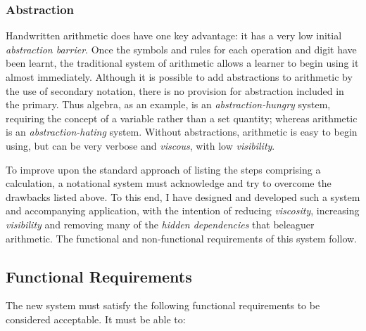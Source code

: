 \documentclass[12pt,twoside,notitlepage,xetex]{report}
\begin{document}
\subsubsection{Abstraction}
Handwritten arithmetic does have one key advantage: it has a very low initial \emph{abstraction barrier}.  Once the symbols and rules for each operation and digit have been learnt, the traditional system of arithmetic allows a learner to begin using it almost immediately.  Although it is possible to add abstractions to arithmetic by the use of secondary notation, there is no provision for abstraction included in the primary.  Thus algebra, as an example, is an \emph{abstraction-hungry} system, requiring the concept of a variable rather than a set quantity; whereas arithmetic is an \emph{abstraction-hating} system.  Without abstractions, arithmetic is easy to begin using, but can be very verbose and \emph{viscous}, with low \emph{visibility}.

To improve upon the standard approach of listing the steps comprising a calculation, a notational system must acknowledge and try to overcome the drawbacks listed above.  To this end, I have designed and developed such a system and accompanying application, with the intention of reducing \emph{viscosity}, increasing \emph{visibility} and removing many of the \emph{hidden dependencies} that beleaguer arithmetic.  The functional and non-functional requirements of this system follow.

%
%
%
\subsection{Functional Requirements}

The new system must satisfy the following functional requirements to be considered acceptable.  It must be able to:
\end{document}

